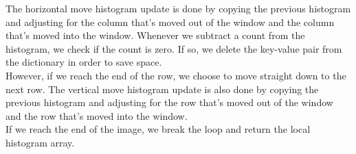\documentclass[UTF8]{ctexart}
\begin{document}
The horizontal move histogram update is done by copying the previous histogram and adjusting for the column that's moved out of the window and the column that's moved into the window.
Whenever we subtract a count from the histogram, we check if the count is zero. If so, we delete the key-value pair from the dictionary in order to save space.\\
However, if we reach the end of the row, we choose to move straight down to the next row. The vertical move histogram update is also done by copying the previous histogram and adjusting for the row that's moved out of the window and the row that's moved into the window.\\
If we reach the end of the image, we break the loop and return the local histogram array.\\
\end{document}
